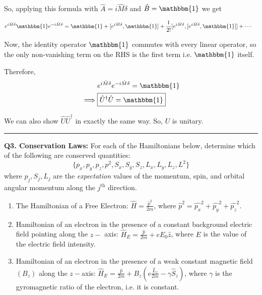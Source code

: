 \documentclass{article}
\begin{document}
So, applying this formula with $\hat{A} = i\hat{M}\delta$ and $\hat{B} = \mathbbm{1}$ we get

\begin{align*}
  e^{i\hat{M}\delta} \mathbbm{1} e^{-i \hat{M} \delta} &= \mathbbm{1} + [e^{i\hat{M}\delta}, \mathbbm{1}] + \frac{1}{2!}[e^{i\hat{M}\delta}, [e^{i\hat{M}\delta}, \mathbbm{1}]] + \cdots
\end{align*}

Now, the identity operator $\mathbbm{1}$ commutes with every linear operator, so the only non-vanishing term on the RHS is the first term i.e. $\mathbbm{1}$ itself.

Therefore, 
\begin{align*}
   & e^{i\hat{M}\delta}e^{-i\hat{M}\delta} = \mathbbm{1} \\
  \implies & \boxed{ \hat{U}^{\dagger} \hat{U} = \mathbbm{1} }
\end{align*}

We can also show $\hat{U} \hat{U}^{\dagger}$ in exactly the same way. So, $U$ is unitary.

\vskip 0.5cm 
\hrule 
\pagebreak

\begin{dottedbox}
  \textbf{Q3. Conservation Laws:} For each of the Hamiltonians below, determine which of the following are conserved quantities:
  \[ \{ p_x, p_y, p_z, p^2, S_x, S_y, S_z, L_x, L_y, L_z, L^2 \} \]
  where $p_j, S_j, L_j$ are the \emph{expectation} values of the momentum, spin, and orbital angular momentum along the $j^{\text{th}}$ direction.

  \vskip 0.5cm
  \begin{enumerate}[label=(\alph*)]
    \item The Hamiltonian of a Free Electron: $\hat{H} = \frac{\hat{p}^2}{2m}$, where $\hat{p}^2 = \hat{p_x}^2 + \hat{p_y}^2 + \hat{p_z}^2$.
    \item Hamiltonian of an electron in the presence of a constant background electric field pointing along the $z-$ axis: $\hat{H}_E = \frac{\hat{p}}{2m} + eE_0\hat{z}$, where $E$ is the value of the electric field intensity.
    \item Hamiltonian of an electron in the presence of a weak constant magnetic field $(B_z)$ along the $z-$axis: $\hat{H}_E = \frac{\hat{p}}{2m}  + B_z \left( e \frac{\hat{L}_z}{2m} - \gamma \hat{S}_z\right)$, where $\gamma$ is the gyromagnetic ratio of the electron, i.e. it is constant.
  \end{enumerate}
\end{dottedbox}
\end{document}
